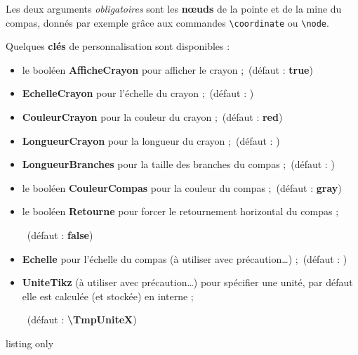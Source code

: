 \documentclass[french,a4paper,11pt]{article}
\newcommand\Cle[1]{{\bfseries\sffamily\textlangle #1\textrangle}}
\begin{document}
\begin{tipblock}
Les deux arguments \textit{obligatoires} sont les \textbf{nœuds} de la pointe et de la mine du compas, donnés par exemple grâce aux commandes \texttt{\textbackslash coordinate} ou \texttt{\textbackslash node}.

\medskip

Quelques \Cle{clés} de personnalisation sont disponibles :

\begin{itemize}
	\item le booléen \Cle{AfficheCrayon} pour afficher le crayon ;\hfill~(défaut : \Cle{true})
	\item \Cle{EchelleCrayon} pour l'échelle du crayon ;\hfill~(défaut : \Cle{1})
	\item \Cle{CouleurCrayon} pour la couleur du crayon ;\hfill~(défaut : \Cle{red})
	\item \Cle{LongueurCrayon} pour la longueur du crayon ;\hfill~(défaut : \Cle{5})
	\item \Cle{LongueurBranches} pour la taille des branches du compas ;\hfill~(défaut : \Cle{6})
	\item le booléen \Cle{CouleurCompas} pour la couleur du compas ;\hfill~(défaut : \Cle{gray})
	\item le booléen \Cle{Retourne} pour forcer le retournement \og horizontal \fg{} du compas ;
	
	\hfill~(défaut : \Cle{false})
	\item \Cle{Echelle} pour l'échelle du compas (à utiliser avec précaution\ldots) ;\hfill~(défaut : \Cle{1})
	\item \Cle{UniteTikz} (à utiliser avec précaution\ldots) pour spécifier une unité, par défaut elle est calculée (et stockée) en interne ;
	
	\hfill~(défaut : \Cle{\textbackslash TmpUniteX})
\end{itemize}
\vspace*{-\baselineskip}\leavevmode
\end{tipblock}

\begin{PresentationCode}{listing only}
\end{PresentationCode}
\end{document}
